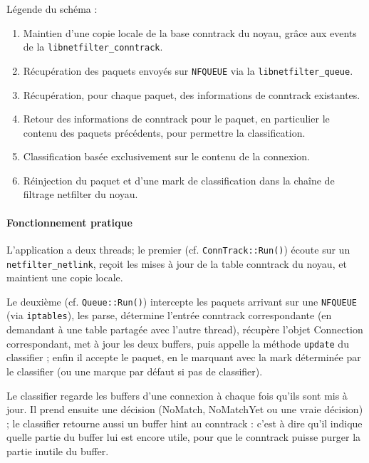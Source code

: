   \begin{footnotesize}
    \noindent Légende du schéma :
    \begin{enumerate}
    \item Maintien d'une copie locale de la base conntrack du noyau, grâce aux \og events \fg{} de la \verb+libnetfilter_conntrack+.
    \item Récupération des paquets envoyés sur \verb+NFQUEUE+ via la \verb+libnetfilter_queue+.
    \item Récupération, pour chaque paquet, des informations de conntrack existantes.
    \item Retour des informations de conntrack pour le paquet, en particulier le contenu des paquets précédents, pour permettre la classification.
    \item Classification basée exclusivement sur le contenu de la connexion.
    \item Réinjection du paquet et d'une \og mark \fg{} de classification dans la chaîne de filtrage netfilter du noyau.
    \end{enumerate}
  \end{footnotesize}

  \paragraph{Fonctionnement pratique}
    L'application a deux threads; le premier (cf. \verb+ConnTrack::Run()+) écoute sur un
    \verb+netfilter_netlink+, reçoit les mises à jour de la table conntrack du noyau, et
    maintient une copie locale.
    
    Le deuxième (cf. \verb+Queue::Run()+) intercepte les paquets arrivant sur une
    \verb+NFQUEUE+ (via \verb+iptables+), les parse, détermine l'entrée conntrack
    correspondante (en demandant à une table partagée avec l'autre
    thread), récupère l'objet \og Connection \fg{} correspondant, met à jour les
    deux buffers, puis appelle la méthode \verb+update+ du classifier ; enfin il
    accepte le paquet, en le marquant avec la mark déterminée par le
    classifier (ou une marque par défaut si pas de classifier).
    
    Le classifier regarde les buffers d'une connexion à chaque fois qu'ils sont mis à jour.
    Il prend ensuite une décision (NoMatch, NoMatchYet ou une vraie décision) ; le classifier retourne aussi un \og buffer hint \fg{} au conntrack : c'est à dire qu'il indique quelle
    partie du buffer lui est encore utile, pour que le conntrack puisse
    purger la partie inutile du buffer.

